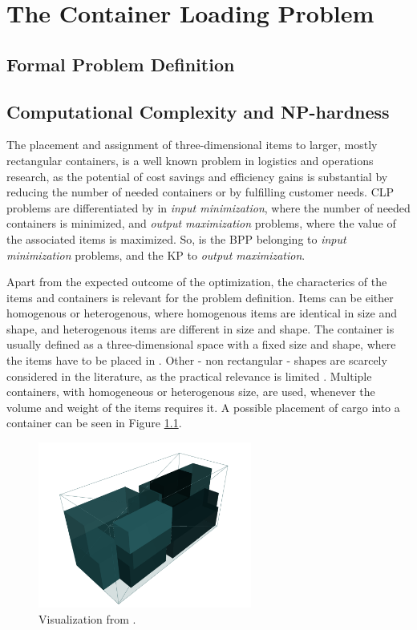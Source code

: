 \chapter{The Container Loading Problem}
\section{Formal Problem Definition}
\section{Computational Complexity and NP-hardness}

The placement and assignment of three-dimensional items to larger, mostly rectangular
containers, is a well known problem in logistics and operations research, as the
potential of cost savings and efficiency gains is substantial by reducing the number
of needed containers or by fulfilling customer needs. \gls{CLP} problems are differentiated
by \cite{bortfeldt_constraints_2013} in \textit{input minimization}, where the number
of needed containers is minimized, and \textit{output maximization} problems, where the
value of the associated items is maximized. So, is the \gls{BPP} belonging
to \textit{input minimization} problems, and the \gls{KP} to \textit{output maximization}.

Apart from the expected outcome of the optimization, the characterics of the items
and containers is relevant for the problem definition. Items can be either homogenous or heterogenous,
where homogenous items are identical in size and shape, and heterogenous items are
different in size and shape. The container is usually defined as a three-dimensional space
with a fixed size and shape, where the items have to be placed in \parencite{bortfeldt_constraints_2013}.
Other - non rectangular - shapes are scarcely considered in the literature, as the practical relevance is
limited \parencite{bortfeldt_constraints_2013}. Multiple containers, with homogeneous
or heterogenous size,  are used, whenever the volume and weight of the items requires it.
A possible placement of cargo into a container can be seen in Figure \ref{fig:solution-visualization}.

\begin{figure}[ht]
    \centering
    \includegraphics[width=7cm]{pictures/3l_cvrp_example.png}
    \caption{Visualization from \cite{tamke_branch-and-cut_2024}.}
    \label{fig:solution-visualization}
\end{figure}

